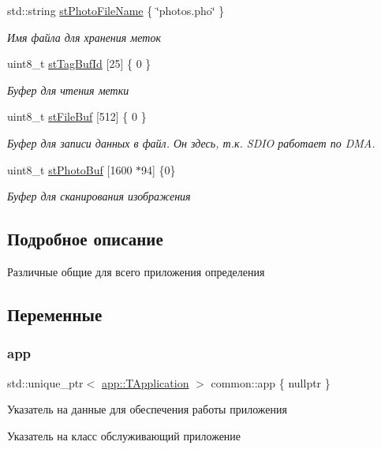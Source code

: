 \begin{DoxyCompactItemize}
\mbox{\label{namespacecommon_a373798ef1a9c0a94b49bc38455d62d10}} 
std\+::string \hyperlink{namespacecommon_a373798ef1a9c0a94b49bc38455d62d10}{st\+Photo\+File\+Name} \{ \char`\"{}photos.\+pho\char`\"{} \}
\begin{DoxyCompactList}\small\item\em Имя файла для хранения меток \end{DoxyCompactList}\item 
\mbox{\label{namespacecommon_ad9edd5582300fe9f535b3d2f912291bb}} 
uint8\+\_\+t \hyperlink{namespacecommon_ad9edd5582300fe9f535b3d2f912291bb}{st\+Tag\+Buf\+Id} \mbox{[}25\mbox{]} \{ 0 \}
\begin{DoxyCompactList}\small\item\em Буфер для чтения метки \end{DoxyCompactList}\item 
\mbox{\label{namespacecommon_a07e080fe05fc55b6f3eab1de78a1157a}} 
uint8\+\_\+t \hyperlink{namespacecommon_a07e080fe05fc55b6f3eab1de78a1157a}{st\+File\+Buf} \mbox{[}512\mbox{]} \{ 0 \}
\begin{DoxyCompactList}\small\item\em Буфер для записи данных в файл. Он здесь, т.\+к. S\+D\+IO работает по D\+MA. \end{DoxyCompactList}\item 
\mbox{\label{namespacecommon_a64410627120637f6951a05b65a001c0e}} 
uint8\+\_\+t \hyperlink{namespacecommon_a64410627120637f6951a05b65a001c0e}{st\+Photo\+Buf} \mbox{[}1600 $\ast$94\mbox{]} \{0\}
\begin{DoxyCompactList}\small\item\em Буфер для сканирования изображения \end{DoxyCompactList}\end{DoxyCompactItemize}


\subsection{Подробное описание}
Различные общие для всего приложения определения 

\subsection{Переменные}
\mbox{\label{namespacecommon_afb09e0e369090296753bc8e2d0274823}} 
\subsubsection{\texorpdfstring{app}{app}}
{\footnotesize\ttfamily std\+::unique\+\_\+ptr$<$ \hyperlink{classapp_1_1_t_application}{app\+::\+T\+Application} $>$ common\+::app \{ nullptr \}}



Указатель на данные для обеспечения работы приложения 

Указатель на класс обслуживающий приложение 